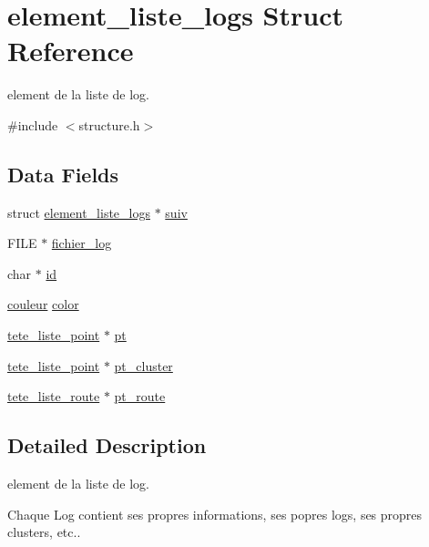 \hypertarget{structelement__liste__logs}{}\section{element\+\_\+liste\+\_\+logs Struct Reference}
\label{structelement__liste__logs}


element de la liste de log.  




{\ttfamily \#include $<$structure.\+h$>$}

\subsection*{Data Fields}
\begin{DoxyCompactItemize}
\item 
struct \hyperlink{structelement__liste__logs}{element\+\_\+liste\+\_\+logs} $\ast$ \hyperlink{structelement__liste__logs_a4b443f8c5ba6c1912ef697fbd1fe90da}{suiv}
\item 
F\+I\+LE $\ast$ \hyperlink{structelement__liste__logs_aa4352ee5157377d3dec9ea703caba011}{fichier\+\_\+log}
\item 
char $\ast$ \hyperlink{structelement__liste__logs_a33dfa7251a6707297bdee089c3430b06}{id}
\item 
\hyperlink{structcouleur}{couleur} \hyperlink{structelement__liste__logs_a641d297d95cc924b33ff852f0b11e54d}{color}
\item 
\hyperlink{structtete__liste__point}{tete\+\_\+liste\+\_\+point} $\ast$ \hyperlink{structelement__liste__logs_adce612305681497b353dc661307261df}{pt}
\item 
\hyperlink{structtete__liste__point}{tete\+\_\+liste\+\_\+point} $\ast$ \hyperlink{structelement__liste__logs_a226ef7e52a9232cc774d08cdcd3f001f}{pt\+\_\+cluster}
\item 
\hyperlink{structtete__liste__route}{tete\+\_\+liste\+\_\+route} $\ast$ \hyperlink{structelement__liste__logs_a9391b1f09c709ee42dd329e5dbbe00dd}{pt\+\_\+route}
\end{DoxyCompactItemize}


\subsection{Detailed Description}
element de la liste de log. 

Chaque Log contient ses propres informations, ses popres logs, ses propres clusters, etc.. 

